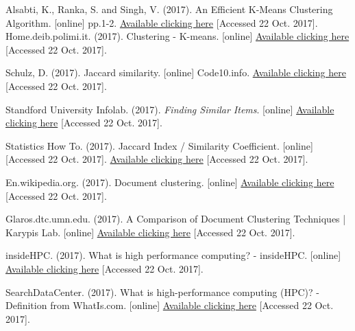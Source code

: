 \documentclass[fleqn,10pt]{SelfArx} %
\begin{document}


\begin{thebibliography}{9}

Alsabti, K., Ranka, S. and Singh, V. (2017). An Efficient K-Means Clustering Algorithm. [online] pp.1-2. \href{https://www.cs.utexas.edu/~kuipers/readings/Alsabti-hpdm-98.pdf}{Available clicking here} [Accessed 22 Oct. 2017].
Home.deib.polimi.it. (2017). Clustering - K-means. [online] \href{http://home.deib.polimi.it/matteucc/Clustering/tutorial_html/kmeans.html}{Available clicking here} [Accessed 22 Oct. 2017].


Schulz, D. (2017). Jaccard similarity. [online] Code10.info. 
\href{http://www.code10.info/index.php?option=com_content&view=article&id=60:articlejaccard-similarity&catid=38:cat_coding_algorithms_data-similarity&Itemid=57}{Available clicking here} [Accessed 22 Oct. 2017].


Standford University Infolab. (2017). \textit{Finding Similar Items}. [online] \href{http://infolab.stanford.edu/~ullman/mmds/ch3.pdf}{Available clicking here} [Accessed 22 Oct. 2017].

Statistics How To. (2017). Jaccard Index / Similarity Coefficient. [online] [Accessed 22 Oct. 2017].
\href{http://www.statisticshowto.com/jaccard-index/}{Available clicking here}  [Accessed 22 Oct. 2017].


En.wikipedia.org. (2017). Document clustering. [online] \href{https://en.wikipedia.org/wiki/Document_clustering}{Available clicking here} [Accessed 22 Oct. 2017].

Glaros.dtc.umn.edu. (2017). A Comparison of Document Clustering Techniques | Karypis Lab. [online] \href{http://glaros.dtc.umn.edu/gkhome/node/157}{Available clicking here} [Accessed 22 Oct. 2017].

insideHPC. (2017). What is high performance computing? - insideHPC. [online] \href{https://insidehpc.com/hpc-basic-training/what-is-hpc/}{Available clicking here}  [Accessed 22 Oct. 2017].

SearchDataCenter. (2017). What is high-performance computing (HPC)? - Definition from WhatIs.com. [online] 
\href{http://searchdatacenter.techtarget.com/definition/high-performance-computing-HPC}{Available clicking here}   [Accessed 22 Oct. 2017].



\end{thebibliography}
\end{document}
